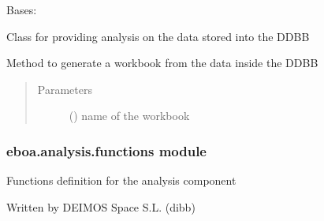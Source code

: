 \begin{fulllineitems}
\label{\detokenize{eboa.analysis:eboa.analysis.analysis.Analysis}}
Bases: 

Class for providing analysis on the data stored into the DDBB

\begin{fulllineitems}
\label{\detokenize{eboa.analysis:eboa.analysis.analysis.Analysis.adjust_column_width}}
\end{fulllineitems}


\begin{fulllineitems}
\label{\detokenize{eboa.analysis:eboa.analysis.analysis.Analysis.generate_workbook_from_ddbb}}
Method to generate a workbook from the data inside the DDBB
\begin{quote}\begin{description}
\item[{Parameters}] \leavevmode
{} () \textendash{} name of the workbook

\end{description}\end{quote}

\end{fulllineitems}


\end{fulllineitems}



\subsubsection{eboa.analysis.functions module}
\label{\detokenize{eboa.analysis:module-eboa.analysis.functions}}\label{\detokenize{eboa.analysis:eboa-analysis-functions-module}}
Functions definition for the analysis component

Written by DEIMOS Space S.L. (dibb)

